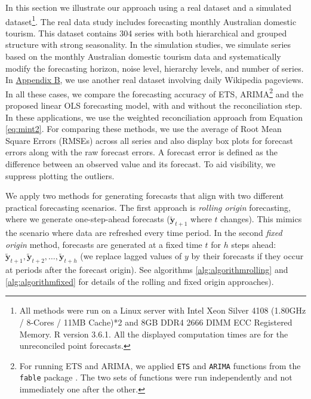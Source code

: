 \documentclass[11pt,a4paper,]{article}
\begin{document}
In this section we illustrate our approach using a real dataset and a simulated dataset\footnote{All methods were run on a Linux server with Intel Xeon Silver 4108 (1.80GHz / 8-Cores / 11MB Cache)*2 and 8GB DDR4 2666 DIMM ECC Registered Memory. R version 3.6.1. All the displayed computation times are for the unreconciled point forecasts.}. The real data study includes forecasting monthly Australian domestic tourism. This dataset contains 304 series with both hierarchical and grouped structure with strong seasonality. In the simulation studies, we simulate series based on the monthly Australian domestic tourism data and systematically modify the forecasting horizon, noise level, hierarchy levels, and number of series. In \protect\hyperlink{appendixB}{Appendix B}, we use another real dataset involving daily Wikipedia pageviews. In all these cases, we compare the forecasting accuracy of ETS, ARIMA\footnote{For running ETS and ARIMA, we applied \texttt{ETS} and \texttt{ARIMA} functions from the \texttt{fable} package \autocite{o2019fable}. The two sets of functions were run independently and not immediately one after the other.} and the proposed linear OLS forecasting model, with and without the reconciliation step. In these applications, we use the weighted reconciliation approach from Equation \eqref{eq:mint2}. For comparing these methods, we use the average of Root Mean Square Errors (RMSEs) across all series and also display box plots for forecast errors along with the raw forecast errors. A forecast error is defined as the difference between an observed value and its forecast. To aid visibility, we suppress plotting the outliers.

We apply two methods for generating forecasts that align with two different practical forecasting scenarios. The first approach is \emph{rolling origin} forecasting, where we generate one-step-ahead forecasts (\(\tilde{\bm{y}}_{t+1}\) where \(t\) changes). This mimics the scenario where data are refreshed every time period. In the second \emph{fixed origin} method, forecasts are generated at a fixed time \(t\) for \(h\) steps ahead: \(\tilde{\bm{y}}_{t+1}, \tilde{\bm{y}}_{t+2},\dots, \tilde{\bm{y}}_{t+h}\) (we replace lagged values of \(y\) by their forecasts if they occur at periods after the forecast origin). See algorithms \ref{alg:algorithmrolling} and \ref{alg:algorithmfixed} for details of the rolling and fixed origin approaches).
\end{document}
